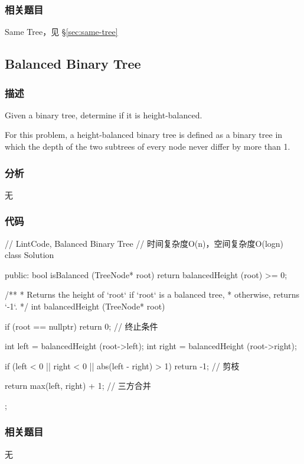 \subsubsection{相关题目}
\begindot
\item Same Tree，见 \S \ref{sec:same-tree}
\myenddot


\subsection{Balanced Binary Tree}
\label{sec:balanced-binary-tree}


\subsubsection{描述}
Given a binary tree, determine if it is height-balanced.

For this problem, a height-balanced binary tree is defined as a binary tree in which the depth of the two subtrees of every node never differ by more than 1.


\subsubsection{分析}
无


\subsubsection{代码}
\begin{Code}
// LintCode, Balanced Binary Tree
// 时间复杂度O(n)，空间复杂度O(logn)
class Solution {
public:
    bool isBalanced (TreeNode* root) {
        return balancedHeight (root) >= 0;
    }

    /**
     * Returns the height of `root` if `root` is a balanced tree,
     * otherwise, returns `-1`.
     */
    int balancedHeight (TreeNode* root) {
        if (root == nullptr) return 0;  // 终止条件

        int left = balancedHeight (root->left);
        int right = balancedHeight (root->right);

        if (left < 0 || right < 0 || abs(left - right) > 1) return -1;  // 剪枝

        return max(left, right) + 1; // 三方合并
    }
};
\end{Code}


\subsubsection{相关题目}
\begindot
\item 无
\myenddot


